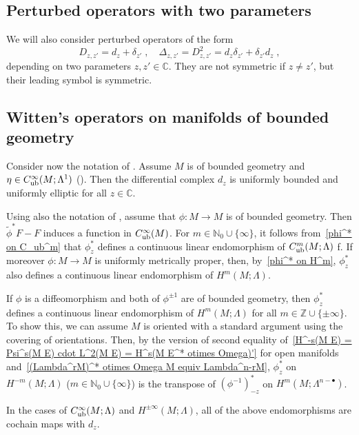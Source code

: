 \documentclass{memo-l}
\theoremstyle{plain}
\theoremstyle{definition}
\theoremstyle{remark}
\newcommand{\C}{\mathbb{C}}
\newcommand{\N}{\mathbb{N}}
\newcommand{\Z}{\mathbb{Z}}
\newcommand{\Cinftyub}{C^\infty_{\text{\rm ub}}}
\numberwithin{section}{chapter}
\numberwithin{equation}{section}%
\begin{document}
\subsection{Perturbed operators with two parameters}\label{ss: two parameters} 

We will also consider perturbed operators of the form
\[
D_{z,z'}=d_z+\delta_{z'}\;,\quad\Delta_{z,z'}=D_{z,z'}^2=d_z\delta_{z'}+\delta_{z'}d_z\;,
\]
depending on two parameters $z,z'\in\C$. They are not symmetric if $z\ne z'$, but their leading symbol is symmetric.



\subsection{Witten's operators on manifolds of bounded geometry}\label{ss: Witten - mfds of bd geom}

Consider now the notation of . Assume $M$ is of bounded geometry and $\eta\in\Cinftyub(M;\Lambda^1)$ (). Then the differential complex $d_z$ is uniformly bounded and uniformly elliptic for all $z\in\C$. 

Using also the notation of , assume that $\phi:M\to M$ is of bounded geometry. Then $\tilde\phi^*F-F$ induces a function in $\Cinftyub(M)$. For $m\in\N_0\cup\{\infty\}$, it follows from~\eqref{phi^* on C_ub^m} that $\phi^*_z$ defines a continuous linear endomorphism of $C_{\text{\rm ub}}^m(M;\Lambda)$ f. If moreover $\phi:M\to M$ is uniformly metrically proper, then, by~\eqref{phi^* on H^m}, $\phi^*_z$ also defines a continuous linear endomorphism of $H^m(M;\Lambda)$. 

If $\phi$ is a diffeomorphism and both of $\phi^{\pm1}$ are of bounded geometry, then $\phi^*_z$ defines a continuous linear endomorphism of $H^m(M;\Lambda)$ for all $m\in\Z\cup\{\pm\infty\}$. To show this, we can assume $M$ is oriented with a standard argument using the covering of orientations. Then, by the version of second equality of~\eqref{H^-s(M E) = Psi^s(M E) cdot L^2(M E) = H^s(M E^* otimes Omega)'} for open manifolds and~\eqref{(Lambda^rM)^* otimes Omega M equiv Lambda^n-rM}, $\phi^*_z$ on $H^{-m}(M;\Lambda)$ ($m\in\N_0\cup\{\infty\}$) is the transpose of $(\phi^{-1})^*_{-z}$ on $H^m(M;\Lambda^{n-\bullet})$.

In the cases of $C_{\text{\rm ub}}^\infty(M;\Lambda)$ and $H^{\pm\infty}(M;\Lambda)$, all of the above endomorphisms are cochain maps with $d_z$.
\end{document}
